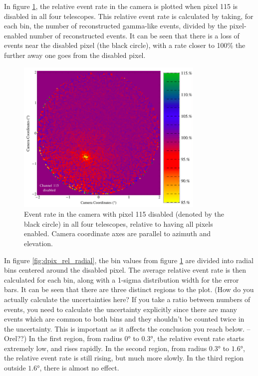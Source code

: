     In figure \ref{fig:dpix_rel_camera}, the relative event rate in the camera is plotted when pixel 115 is disabled in all four telescopes.
    This relative event rate is calculated by taking, for each bin, the number of reconstructed gamma-like events, divided by the pixel-enabled number of reconstructed events.
    It can be seen that there is a loss of events near the disabled pixel (the black circle), with a rate closer to 100\% the further away one goes from the disabled pixel.

    \begin{figure}[ht]
      \begin{center}
        \includegraphics[width=0.8\textwidth]{images/disabled_pixel/relativerate_camera}
        \caption[Relative Event Rate]{Event rate in the camera with pixel 115 disabled (denoted by the black circle) in all four telescopes, relative to having all pixels enabled.  Camera coordinate axes are parallel to azimuth and elevation.}\label{fig:dpix_rel_camera}
      \end{center}
    \end{figure}

    In figure \ref{fig:dpix_rel_radial}, the bin values from figure \ref{fig:dpix_rel_camera} are divided into radial bins centered around the disabled pixel.
    The average relative event rate is then calculated for each bin, along with a 1-sigma distribution width for the error bars.
    It can be seen that there are three distinct regions to the plot.
    (How do you actually calculate the uncertainties here? If you take a ratio between numbers of events, you need to calculate the uncertainty explicitly since there are many events which are common to both bins and they shouldn’t be counted twice in the uncertainty.  This is important as it affects the conclusion you reach below. --Orel??)
    In the first region, from radius $\ang{0}$ to $\ang{0.3}$, the relative event rate starts extremely low, and rises rapidly.
    In the second region, from radius $\ang{0.3}$ to $\ang{1.6}$, the relative event rate is still rising, but much more slowly.
    In the third region outside $\ang{1.6}$, there is almost no effect.

